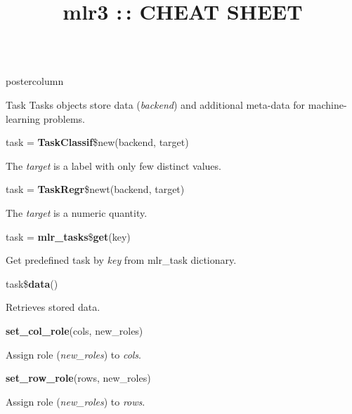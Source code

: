 \documentclass{beamer}
\title{mlr3 :\,: CHEAT SHEET} %
\newlength{\columnheight} %
\begin{document}
\begin{frame}[fragile]{}
\begin{columns}
	\begin{column}{.31\textwidth}
		\begin{beamercolorbox}[center]{postercolumn}
			\begin{minipage}{.98\textwidth}
				\parbox[t][\columnheight]{\textwidth}{				
					\begin{myblock}{Task}
						Tasks objects store data (\textit{backend}) and additional meta-data for machine-learning problems.
						\\
						\begin{codebox}
							task = \textbf{TaskClassif}\$new(backend, target)
						\end{codebox}
						\hspace*{1ex}The \textit{target} is a label with only few distinct values.
						\\
						\begin{codebox}
							task = \textbf{TaskRegr}\$newt(backend, target)
						\end{codebox}
						\hspace*{1ex}The \textit{target} is a numeric quantity.
						\\
						\begin{codebox}
							task = \textbf{mlr\_tasks}\$\textbf{get}(key)
						\end{codebox}
						\hspace*{1ex}Get predefined task by \textit{key} from mlr\_task dictionary.
						\\
						\begin{codebox}
							task\$\textbf{data}()
						\end{codebox}
						\hspace*{1ex}Retrieves stored data.
						\\
						\begin{codebox}
							\textbf{set\_col\_role}(cols, new\_roles)
						\end{codebox}
						\hspace*{1ex} Assign role (\textit{new\_roles}) to \textit{cols}.
						\\
						\begin{codebox}
							\textbf{set\_row\_role}(rows, new\_roles)
						\end{codebox}
						\hspace*{1ex} Assign role (\textit{new\_roles}) to \textit{rows}.
						\\
						\begin{codebox}

\end{codebox}
\end{myblock}}
\end{minipage}
\end{beamercolorbox}
\end{column}
\end{columns}
\end{frame}
\end{document}
